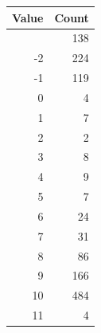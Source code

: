 \documentclass[
]{article}
\begin{document}
\begin{figure}

\begin{minipage}{0.50\linewidth}

\begin{longtable}[]{@{}rr@{}}
\toprule\noalign{}
Value & Count \\
\midrule\noalign{}
\endhead
\bottomrule\noalign{}
\endlastfoot
-3 & 138 \\
-2 & 224 \\
-1 & 119 \\
0 & 4 \\
1 & 7 \\
2 & 2 \\
3 & 8 \\
4 & 9 \\
5 & 7 \\
6 & 24 \\
7 & 31 \\
8 & 86 \\
9 & 166 \\
10 & 484 \\
11 & 4 \\
\end{longtable}

\end{minipage}%
%
\begin{minipage}{0.50\linewidth}


\end{minipage}
\end{figure}
\end{document}
